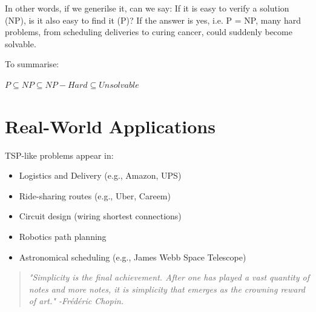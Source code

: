\documentclass[12pt]{exam}
\begin{document}
In other words, if we generilse it, can we say: If it is easy to verify a solution (NP), is it also easy to find it (P)? If the answer is yes, i.e. P = NP, many hard problems, from scheduling deliveries to curing cancer, could suddenly become solvable.

To summarise:
\begin{center}
$P \subseteq NP \subseteq NP-Hard \subseteq Unsolvable$ 
\end{center}

\section{Real-World Applications}

TSP-like problems appear in:
\begin{itemize}
    \item Logistics and Delivery (e.g., Amazon, UPS)
    \item Ride-sharing routes (e.g., Uber, Careem)
    \item Circuit design (wiring shortest connections)
    \item Robotics path planning
    \item Astronomical scheduling (e.g., James Webb Space Telescope)
\end{itemize}



\begin{quote}
    \textit{"Simplicity is the final achievement. After one has played a vast quantity of notes and more notes, it is simplicity that emerges as the crowning reward of art." -Frédéric Chopin.}
\end{quote}









\renewcommand\thefootnote{}


\renewcommand\thefootnote{\fnsymbol{footnote}}
\setcounter{footnote}{1}


%  

% 
\end{document}

